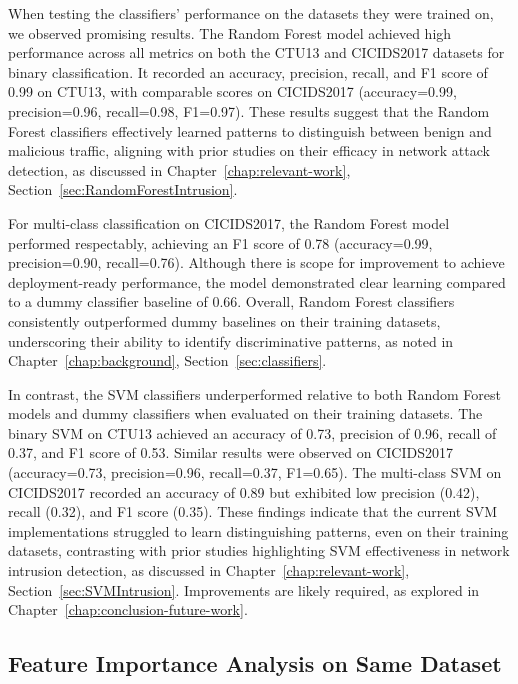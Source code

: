 When testing the classifiers’ performance on the datasets they were trained on, we observed promising results. The Random Forest model achieved high performance across all metrics on both the CTU13 and CICIDS2017 datasets for binary classification. It recorded an accuracy, precision, recall, and F1 score of 0.99 on CTU13, with comparable scores on CICIDS2017 (accuracy=0.99, precision=0.96, recall=0.98, F1=0.97). These results suggest that the Random Forest classifiers effectively learned patterns to distinguish between benign and malicious traffic, aligning with prior studies on their efficacy in network attack detection, as discussed in Chapter~\ref{chap:relevant-work}, Section~\ref{sec:RandomForestIntrusion}.

For multi-class classification on CICIDS2017, the Random Forest model performed respectably, achieving an F1 score of 0.78 (accuracy=0.99, precision=0.90, recall=0.76). Although there is scope for improvement to achieve deployment-ready performance, the model demonstrated clear learning compared to a dummy classifier baseline of 0.66. Overall, Random Forest classifiers consistently outperformed dummy baselines on their training datasets, underscoring their ability to identify discriminative patterns, as noted in Chapter~\ref{chap:background}, Section~\ref{sec:classifiers}.

In contrast, the SVM classifiers underperformed relative to both Random Forest models and dummy classifiers when evaluated on their training datasets. The binary SVM on CTU13 achieved an accuracy of 0.73, precision of 0.96, recall of 0.37, and F1 score of 0.53. Similar results were observed on CICIDS2017 (accuracy=0.73, precision=0.96, recall=0.37, F1=0.65). The multi-class SVM on CICIDS2017 recorded an accuracy of 0.89 but exhibited low precision (0.42), recall (0.32), and F1 score (0.35). These findings indicate that the current SVM implementations struggled to learn distinguishing patterns, even on their training datasets, contrasting with prior studies highlighting SVM effectiveness in network intrusion detection, as discussed in Chapter~\ref{chap:relevant-work}, Section~\ref{sec:SVMIntrusion}. Improvements are likely required, as explored in Chapter~\ref{chap:conclusion-future-work}.

\subsection{Feature Importance Analysis on Same Dataset}\label{subsec:feature-importance-analysis-same-dataset}

